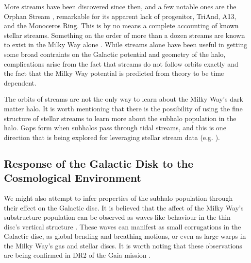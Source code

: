 More streams have been discovered since then, and a few notable ones are the Orphan Stream \citep{grillmair_2006,belokurov_2007,newberg_2010}, remarkable for its apparent lack of progenitor, TriAnd, A13, and the Monoceros Ring. This is by no means a complete accounting of known stellar streams. Something on the order of more than a dozen streams are known to exist in the Milky Way alone \citep{sanders_binney_2013_a}. While streams alone have been useful in getting some broad contraints on the Galactic potential and geometry of the halo, complications arise from the fact that streams do not follow orbits exactly \citet{sanders_binney_2013_a} and the fact that the Milky Way potential is predicted from theory to be time dependent.

The orbits of streams are not the only way to learn about the Milky Way's dark matter halo. It is worth mentioning that there is the possibility of using the fine structure of stellar streams to learn more about the subhalo population in the halo.  Gaps form when subhalos pass through tidal streams, and this is one direction that is being explored for leveraging stellar stream data (e.g. \citet{erkal_2016_stream_gaps}).

\subsection{Response of the Galactic Disk to the Cosmological Environment}


We might also attempt to infer properties of the subhalo population through their effect on the Galactic disc.  It is believed that the affect of the Milky Way's substructure population can be observed as waves-like behaviour in the thin disc's vertical structure \citep{widrow_2012_sdss,carlin_2013_lamost, williams_2013_rave,xu_2015, carrillo_2018_rave}.  These waves can manifest as small corrugations in the Galactic disc, as global bending and breathing motions, or even as large warps in the Milky Way's gas  \citep{gasWarp} and stellar discs. It is worth noting that these observations are being confirmed in DR2 of the Gaia mission \citep[for example]{gaia_collab,bennet_2019_gaia}.

